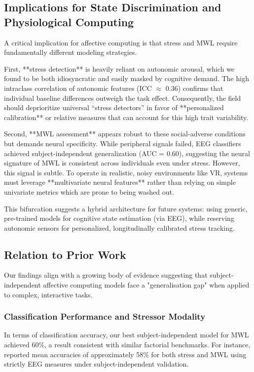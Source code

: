 \documentclass[lettersize,journal]{IEEEtran}
\begin{document}
\subsection{Implications for State Discrimination and Physiological Computing}

A critical implication for affective computing is that stress and MWL require fundamentally different modeling strategies.

First, **stress detection** is heavily reliant on autonomic arousal, which we found to be both idiosyncratic and easily masked by cognitive demand. The high intraclass correlation of autonomic features (ICC $\approx$ 0.36) confirms that individual baseline differences outweigh the task effect. Consequently, the field should deprioritize universal ``stress detectors'' in favor of **personalized calibration** or relative measures that can account for this high trait variability.

Second, **MWL assessment** appears robust to these social-adverse conditions but demands neural specificity. While peripheral signals failed, EEG classifiers achieved subject-independent generalization (AUC = 0.60), suggesting the neural signature of MWL is consistent across individuals even under stress. However, this signal is subtle. To operate in realistic, noisy environments like VR, systems must leverage **multivariate neural features** rather than relying on simple univariate metrics which are prone to being washed out.

This bifurcation suggests a hybrid architecture for future systems: using generic, pre-trained models for cognitive state estimation (via EEG), while reserving autonomic sensors for personalized, longitudinally calibrated stress tracking.




\subsection{Relation to Prior Work}

Our findings align with a growing body of evidence suggesting that subject-independent affective computing models face a "generalisation gap" when applied to complex, interactive tasks. 

\subsubsection{Classification Performance and Stressor Modality}
In terms of classification accuracy, our best subject-independent model for MWL achieved 60\%, a result consistent with similar factorial benchmarks. For instance, \cite{bagheriSimultaneousClassificationBoth2022} reported mean accuracies of approximately 58\% for both stress and MWL using strictly EEG measures under subject-independent validation. 
\end{document}
